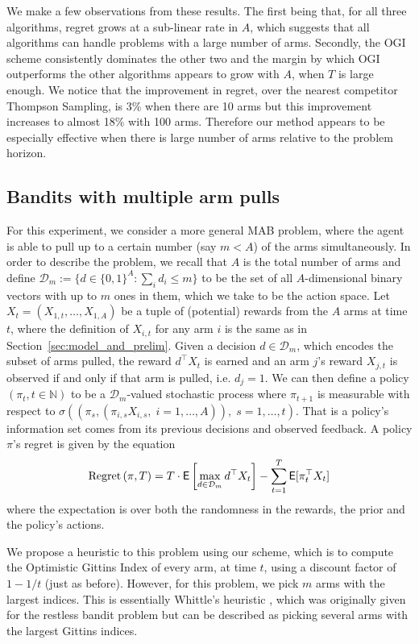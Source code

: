 We make a few observations from these results. The first being that, for all three algorithms, regret grows at a sub-linear rate in $A$, which suggests that all algorithms can handle problems with a large number of arms. Secondly, the OGI scheme consistently dominates the other two and the margin by which OGI outperforms the other algorithms appears to grow with $A$, when $T$ is large enough. We notice that the improvement in regret, over the nearest competitor Thompson Sampling, is 3\% when there are 10 arms but this improvement increases to almost 18\% with 100 arms. Therefore our method appears to be especially effective when there is large number of arms relative to the problem horizon.
\subsection{Bandits with multiple arm pulls}
For this experiment, we consider a more general MAB problem, where the agent is able to pull up to a certain number (say $m < A$) of the arms simultaneously. In order to describe the problem, we recall that $A$ is the total number of arms and define  $\mathcal{D}_m := \{d \in \{0,1\}^A : \sum_i d_i \le m\}$ to be the set of all $A$-dimensional binary vectors with up to $m$ ones in them, which we take to be the action space. Let $X_t = (X_{1,t}, \ldots, X_{1,A})$ be a tuple of (potential) rewards from the $A$ arms at time $t$, where the definition of $X_{i,t}$ for any arm $i$ is the same as in Section~\ref{sec:model_and_prelim}. Given a decision $d \in \mathcal D_m$, which encodes the subset of arms pulled, the reward $d^\top X_t$ is earned and an arm $j$'s reward $X_{j,t}$ is observed if and only if that arm is pulled, i.e. $d_{j} = 1$. We can then define a policy $(\pi_t, t \in \mathbb{N})$ to be a $\mathcal{D}_m$-valued stochastic process where $\pi_{t+1}$ is measurable with respect to $\sigma\left( (\pi_s, (\pi_{i,s} X_{i,s}, \;i =1,\ldots,A)), \; s=1,\ldots,t\right)$. That is a policy's information set comes from its previous decisions and observed feedback. A policy $\pi$'s regret is given by the equation 
\[
\textnormal{Regret} \left( \pi, T \right) = T \cdot \mathsf{E} \left[ \max_{d \in \mathcal D_m} d^\top  X_t \right] - \sum_{t=1}^T \mathsf{E}[\pi_t^\top X_t ]
\]
where the expectation is over both the randomness in the rewards, the prior and the policy's actions.

We propose a heuristic to this problem using our scheme, which is to compute the Optimistic Gittins Index of every arm, at time $t$, using a discount factor of $1-1/t$ (just as before). However, for this problem, we pick $m$ arms with the largest indices. This is essentially Whittle's heuristic \citep{whittle1988restless}, which was originally given for the restless bandit problem but can be described as picking several arms with the largest Gittins indices.

